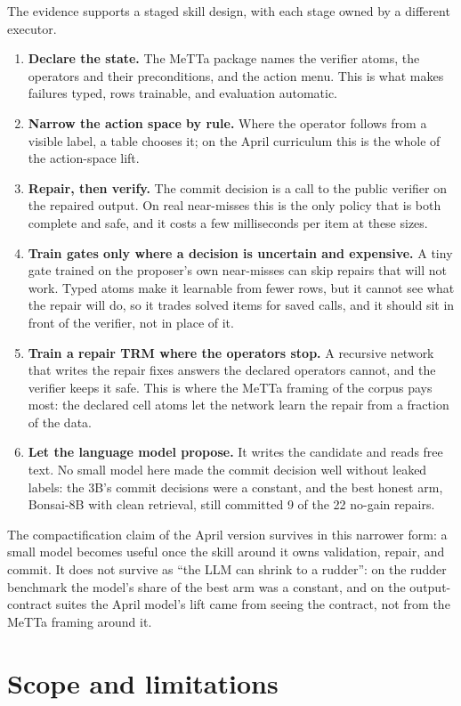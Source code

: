 \documentclass[11pt]{article}
\begin{document}
The evidence supports a staged skill design, with each stage owned by a different executor.
\begin{enumerate}[leftmargin=*]
  \item \textbf{Declare the state.} The MeTTa package names the verifier atoms, the operators and their preconditions, and the action menu. This is what makes failures typed, rows trainable, and evaluation automatic.
  \item \textbf{Narrow the action space by rule.} Where the operator follows from a visible label, a table chooses it; on the April curriculum this is the whole of the action-space lift.
  \item \textbf{Repair, then verify.} The commit decision is a call to the public verifier on the repaired output. On real near-misses this is the only policy that is both complete and safe, and it costs a few milliseconds per item at these sizes.
  \item \textbf{Train gates only where a decision is uncertain and expensive.} A tiny gate trained on the proposer's own near-misses can skip repairs that will not work. Typed atoms make it learnable from fewer rows, but it cannot see what the repair will do, so it trades solved items for saved calls, and it should sit in front of the verifier, not in place of it.
  \item \textbf{Train a repair TRM where the operators stop.} A recursive network that writes the repair fixes answers the declared operators cannot, and the verifier keeps it safe. This is where the MeTTa framing of the corpus pays most: the declared cell atoms let the network learn the repair from a fraction of the data.
  \item \textbf{Let the language model propose.} It writes the candidate and reads free text. No small model here made the commit decision well without leaked labels: the 3B's commit decisions were a constant, and the best honest arm, Bonsai-8B with clean retrieval, still committed 9 of the 22 no-gain repairs.
\end{enumerate}
The compactification claim of the April version survives in this narrower form: a small model becomes useful once the skill around it owns validation, repair, and commit. It does not survive as ``the LLM can shrink to a rudder'': on the rudder benchmark the model's share of the best arm was a constant, and on the output-contract suites the April model's lift came from seeing the contract, not from the MeTTa framing around it.

\section{Scope and limitations}
\label{sec:limits}
\end{document}
